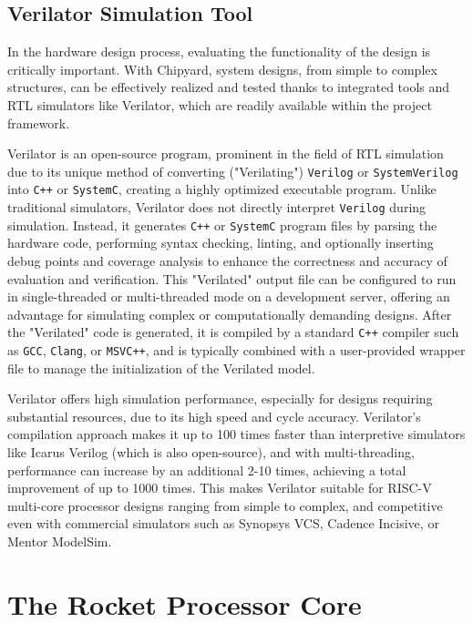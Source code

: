 \subsection{Verilator Simulation Tool}
\label{subsec:verilator}

In the hardware design process, evaluating the functionality of the design is critically important. With Chipyard, system designs, from simple to complex structures, can be effectively realized and tested thanks to integrated tools and RTL simulators like Verilator, which are readily available within the project framework.

Verilator is an open-source program, prominent in the field of RTL simulation due to its unique method of converting ("Verilating") \texttt{Verilog} or \texttt{SystemVerilog} into \texttt{C++} or \texttt{SystemC}, creating a highly optimized executable program. Unlike traditional simulators, Verilator does not directly interpret \texttt{Verilog} during simulation. Instead, it generates \texttt{C++} or \texttt{SystemC} program files by parsing the hardware code, performing syntax checking, linting, and optionally inserting debug points and coverage analysis to enhance the correctness and accuracy of evaluation and verification. This "Verilated" output file can be configured to run in single-threaded or multi-threaded mode on a development server, offering an advantage for simulating complex or computationally demanding designs. After the "Verilated" code is generated, it is compiled by a standard \texttt{C++} compiler such as \texttt{GCC}, \texttt{Clang}, or \texttt{MSVC++}, and is typically combined with a user-provided wrapper file to manage the initialization of the Verilated model.

Verilator offers high simulation performance, especially for designs requiring substantial resources, due to its high speed and cycle accuracy. Verilator's compilation approach makes it up to 100 times faster than interpretive simulators like Icarus Verilog (which is also open-source), and with multi-threading, performance can increase by an additional 2-10 times, achieving a total improvement of up to 1000 times. This makes Verilator suitable for RISC-V multi-core processor designs ranging from simple to complex, and competitive even with commercial simulators such as Synopsys VCS, Cadence Incisive, or Mentor ModelSim.

\section{The Rocket Processor Core}
\label{sec:rocket_core}

